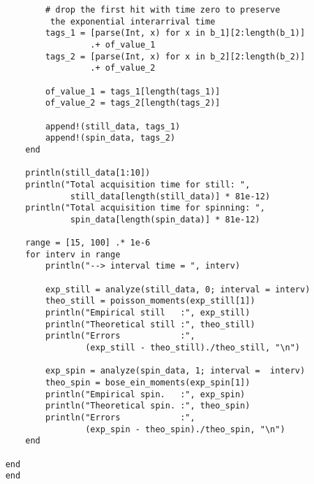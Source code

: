 \documentclass[10pt, a4paper, final]{article}
\begin{document}
\begin{mdframed}
\begin{lstlisting}
            # drop the first hit with time zero to preserve
             the exponential interarrival time
            tags_1 = [parse(Int, x) for x in b_1][2:length(b_1)]
                     .+ of_value_1
            tags_2 = [parse(Int, x) for x in b_2][2:length(b_2)]
                     .+ of_value_2
    
            of_value_1 = tags_1[length(tags_1)]
            of_value_2 = tags_2[length(tags_2)]
    
            append!(still_data, tags_1)
            append!(spin_data, tags_2)
        end
    
        println(still_data[1:10])
        println("Total acquisition time for still: ",
                 still_data[length(still_data)] * 81e-12)
        println("Total acquisition time for spinning: ",
                 spin_data[length(spin_data)] * 81e-12)
    
        range = [15, 100] .* 1e-6
        for interv in range
            println("--> interval time = ", interv)
            
            exp_still = analyze(still_data, 0; interval = interv)
            theo_still = poisson_moments(exp_still[1])
            println("Empirical still   :", exp_still)
            println("Theoretical still :", theo_still)
            println("Errors            :", 
                    (exp_still - theo_still)./theo_still, "\n")
    
            exp_spin = analyze(spin_data, 1; interval =  interv)
            theo_spin = bose_ein_moments(exp_spin[1])
            println("Empirical spin.   :", exp_spin)
            println("Theoretical spin. :", theo_spin)
            println("Errors            :",
                    (exp_spin - theo_spin)./theo_spin, "\n")
        end
    
    end
    end
  \end{lstlisting}
\end{mdframed}
\end{document}
